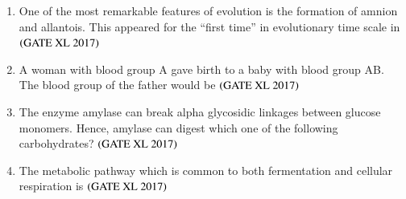 \documentclass[journal]{IEEEtran}
\begin{document}
\begin{enumerate}
\item One of the most remarkable features of evolution is the formation of amnion and allantois. This appeared for the ``first time'' in evolutionary time scale in \hfill $\left(\text{GATE XL 2017}\right)$
\begin{enumerate}
\end{enumerate}

\item A woman with blood group A gave birth to a baby with blood group AB. The blood group of the father would be \hfill $\left(\text{GATE XL 2017}\right)$
\begin{enumerate}
\end{enumerate}

\item The enzyme amylase can break alpha glycosidic linkages between glucose monomers. Hence, amylase can digest which one of the following carbohydrates? \hfill $\left(\text{GATE XL 2017}\right)$
\begin{enumerate}
\end{enumerate}

\item The metabolic pathway which is common to both fermentation and cellular respiration is \hfill $\left(\text{GATE XL 2017}\right)$
\begin{enumerate}
\end{enumerate}


\end{enumerate}
\end{document}

